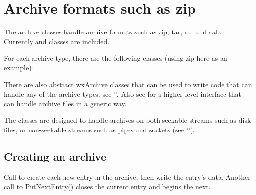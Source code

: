 
\section{Archive formats such as zip}\label{wxarc}

The archive classes handle archive formats such as zip, tar, rar and cab.
Currently 
and  classes are included.

For each archive type, there are the following classes (using zip here
as an example):

\begin{twocollist}\twocolwidtha{4cm}
\end{twocollist}

There are also abstract wxArchive classes that can be used to write code
that can handle any of the archive types,
see ''.
Also see  for a higher level interface that
can handle archive files in a generic way.

The classes are designed to handle archives on both seekable streams such
as disk files, or non-seekable streams such as pipes and sockets
(see '').




\subsection{Creating an archive}\label{wxarccreate}


Call  to
create each new entry in the archive, then write the entry's data.
Another call to PutNextEntry() closes the current entry and begins the next.

